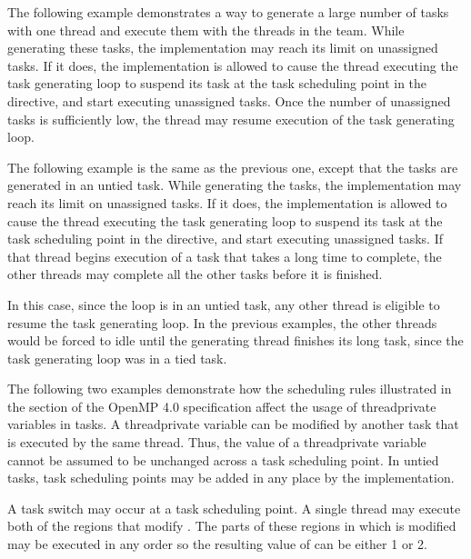 The following example demonstrates a way to generate a large number of tasks with 
one thread and execute them with the threads in the team. While generating these 
tasks, the implementation may reach its limit on unassigned tasks.  If it does, 
the implementation is allowed to cause the thread executing the task generating 
loop to suspend its task at the task scheduling point in the  directive, 
and start executing unassigned tasks.  Once the number of unassigned tasks is sufficiently 
low, the thread may resume execution of the task generating loop.



The following example is the same as the previous one, except that the tasks are 
generated in an untied task. While generating the tasks, the implementation may 
reach its limit on unassigned tasks. If it does, the implementation is allowed 
to cause the thread executing the task generating loop to suspend its task at the 
task scheduling point in the  directive, and start executing unassigned 
tasks.  If that thread begins execution of a task that takes a long time to complete, 
the other threads may complete all the other tasks before it is finished.

In this case, since the loop is in an untied task, any other thread is eligible 
to resume the task generating loop. In the previous examples, the other threads 
would be forced to idle until the generating thread finishes its long task, since 
the task generating loop was in a tied task.



The following two examples demonstrate how the scheduling rules illustrated in 
the  section of the OpenMP 4.0 specification affect the usage of 
threadprivate variables in tasks. A threadprivate 
variable can be modified by another task that is executed by the same thread. Thus, 
the value of a threadprivate variable cannot be assumed to be unchanged 
across a task scheduling point. In untied tasks, task scheduling points may be 
added in any place by the implementation.

A task switch may occur at a task scheduling point. A single thread may execute 
both of the  regions that modify . The parts of these  regions 
in which  is modified may be executed in any order so the resulting 
value of  can be either 1 or 2.

